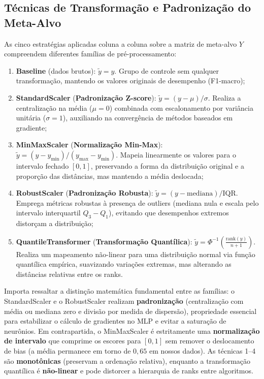 \documentclass[12pt]{article}
\begin{document}
\subsection{Técnicas de Transformação e Padronização do Meta-Alvo}

As cinco estratégias aplicadas coluna a coluna sobre a matriz de meta-alvo $Y$ compreendem diferentes famílias de pré-processamento:
\begin{enumerate}
  \item \textbf{Baseline} (dados brutos): $\tilde{y} = y$. Grupo de controle sem qualquer transformação, mantendo os valores originais de desempenho (F1-macro);
  \item \textbf{StandardScaler} (\textbf{Padronização Z-score}): $\tilde{y} = (y - \mu) / \sigma$. Realiza a centralização na média ($\mu=0$) combinada com escalonamento por variância unitária ($\sigma=1$), auxiliando na convergência de métodos baseados em gradiente;
  \item \textbf{MinMaxScaler} (\textbf{Normalização Min-Max}): $\tilde{y} = (y - y_{\min}) / (y_{\max} - y_{\min})$. Mapeia linearmente os valores para o intervalo fechado $[0, 1]$, preservando a forma da distribuição original e a proporção das distâncias, mas mantendo a média deslocada;
  \item \textbf{RobustScaler} (\textbf{Padronização Robusta}): $\tilde{y} = (y - \text{mediana}) / \text{IQR}$. Emprega métricas robustas à presença de outliers (mediana nula e escala pelo intervalo interquartil $Q_3 - Q_1$), evitando que desempenhos extremos distorçam a distribuição;
  \item \textbf{QuantileTransformer} (\textbf{Transformação Quantílica}): $\tilde{y} = \Phi^{-1}\!\left( \frac{\text{rank}(y)}{n+1} \right)$. Realiza um mapeamento não-linear para uma distribuição normal via função quantílica empírica, suavizando variações extremas, mas alterando as distâncias relativas entre os ranks.
\end{enumerate}

Importa ressaltar a distinção matemática fundamental entre as famílias: o StandardScaler e o RobustScaler realizam \textbf{padronização} (centralização com média ou mediana zero e divisão por medida de dispersão), propriedade essencial para estabilizar o cálculo de gradientes no MLP e evitar a saturação de neurônios. Em contrapartida, o MinMaxScaler é estritamente uma \textbf{normalização de intervalo} que comprime os escores para $[0, 1]$ sem remover o deslocamento de bias (a média permanece em torno de $0{,}65$ em nossos dados). As técnicas 1--4 são \textbf{monotônicas} (preservam a ordenação relativa), enquanto a transformação quantílica é \textbf{não-linear} e pode distorcer a hierarquia de ranks entre algoritmos.
\end{document}
